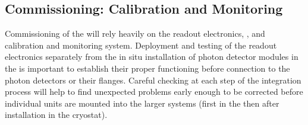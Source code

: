
\subsection{Commissioning: Calibration and Monitoring}
\label{sec:fdsp-pd-install-calib}




Commissioning of the   will rely heavily on the readout electronics, , and calibration and monitoring system.  Deployment and testing of the readout electronics separately from the in situ installation of photon detector modules in the  is important to establish their proper functioning before connection to the photon detectors or their flanges.  Careful checking at each step of the integration process will help to find unexpected problems early enough to be corrected before individual units are mounted into the larger systems (first in the  then after installation in the cryostat). 

